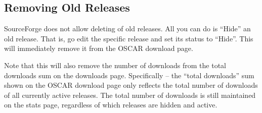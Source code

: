 
\subsection{Removing Old Releases}

SourceForge does not allow deleting of old releases.  All you can do
is ``Hide'' an old release.  That is, go edit the specific release and
set its status to ``Hide''.  This will immediately remove it from the
OSCAR download page.

Note that this will also remove the number of downloads from the total
downloads sum on the downloads page.  Specifically -- the ``total
downloads'' sum shown on the OSCAR download page only reflects the
total number of downloads of all currently active releases.  The total
number of downloads is still maintained on the stats page, regardless
of which releases are hidden and active.

